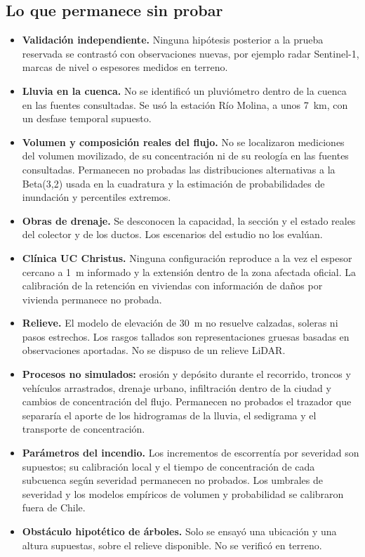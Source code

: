 \subsection*{Lo que permanece sin probar}
\begin{itemize}
\item \textbf{Validación independiente.} Ninguna hipótesis posterior a la prueba reservada se contrastó con observaciones nuevas, por ejemplo radar Sentinel-1, marcas de nivel o espesores medidos en terreno.
\item \textbf{Lluvia en la cuenca.} No se identificó un pluviómetro dentro de la cuenca en las fuentes consultadas. Se usó la estación Río Molina, a unos \SI{7}{km}, con un desfase temporal supuesto.
\item \textbf{Volumen y composición reales del flujo.} No se localizaron mediciones del volumen movilizado, de su concentración ni de su reología en las fuentes consultadas. Permanecen no probadas las distribuciones alternativas a la Beta(3,2) usada en la cuadratura y la estimación de probabilidades de inundación y percentiles extremos.
\item \textbf{Obras de drenaje.} Se desconocen la capacidad, la sección y el estado reales del colector y de los ductos. Los escenarios del estudio no los evalúan.
\item \textbf{Clínica UC Christus.} Ninguna configuración reproduce a la vez el espesor cercano a \SI{1}{m} informado y la extensión dentro de la zona afectada oficial. La calibración de la retención en viviendas con información de daños por vivienda permanece no probada.
\item \textbf{Relieve.} El modelo de elevación de \SI{30}{m} no resuelve calzadas, soleras ni pasos estrechos. Los rasgos tallados son representaciones gruesas basadas en observaciones aportadas. No se dispuso de un relieve LiDAR.
\item \textbf{Procesos no simulados:} erosión y depósito durante el recorrido, troncos y vehículos arrastrados, drenaje urbano, infiltración dentro de la ciudad y cambios de concentración del flujo. Permanecen no probados el trazador que separaría el aporte de los hidrogramas de la lluvia, el sedigrama y el transporte de concentración.
\item \textbf{Parámetros del incendio.} Los incrementos de escorrentía por severidad son supuestos; su calibración local y el tiempo de concentración de cada subcuenca según severidad permanecen no probados. Los umbrales de severidad y los modelos empíricos de volumen y probabilidad se calibraron fuera de Chile.
\item \textbf{Obstáculo hipotético de árboles.} Solo se ensayó una ubicación y una altura supuestas, sobre el relieve disponible. No se verificó en terreno.
\end{itemize}

